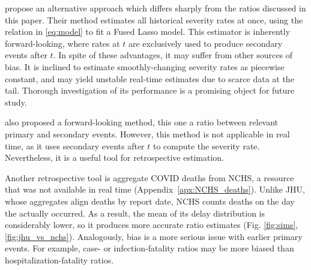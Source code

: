 \documentclass{article}
\begin{document}


\citet{fusedlasso} propose an alternative approach which differs sharply from the ratios discussed in this paper. Their method estimates all historical severity rates at once, using the relation in \eqref{eq:model} to fit a Fused Lasso model. This estimator is inherently forward-looking, where rates at $t$ are exclusively used to produce secondary events after $t$. In spite of these advantages, it may suffer from other sources of bias. It is inclined to estimate smoothly-changing severity rates as piecewise constant, and may yield unstable real-time estimates due to scarce data at the tail. 
Thorough investigation of its performance is a promising object for future study.

\citet{UKpaper} also proposed a forward-looking method, this one a ratio between relevant primary and secondary events. However, this method is not applicable in real time, as it uses secondary events after $t$ to compute the severity rate. Nevertheless, it is a useful tool for retrospective estimation. 

Another retrospective tool is aggregate COVID deaths from NCHS, a resource that was not available in real time (Appendix~\ref{apx:NCHS_deaths}). Unlike JHU, whose aggregates align deaths by report date, NCHS counts deaths on the day the actually occurred. As a result, the mean of its delay distribution is considerably lower, so it produces more accurate ratio estimates (Fig. \ref{fig:sims}, \ref{fig:jhu_vs_nchs}). Analogously, bias is a more serious issue with earlier primary events. For example, case- or infection-fatality ratios may be more biased than hospitalization-fatality ratios. 
\end{document}
